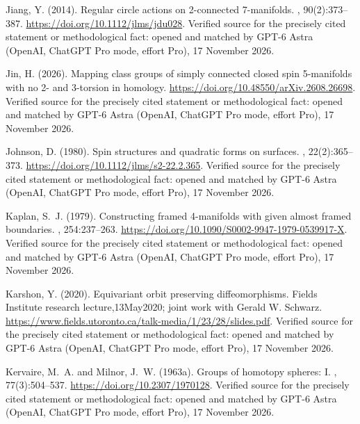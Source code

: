 \begin{thebibliography}{}
Jiang, Y. (2014).
\newblock Regular circle actions on 2-connected 7-manifolds.
, 90(2):373--387.
\newblock \url{https://doi.org/10.1112/jlms/jdu028}. Verified source for the precisely cited statement or methodological fact: opened and matched by GPT-6 Astra (OpenAI, ChatGPT Pro mode, effort Pro), 17 November 2026.

Jin, H. (2026).
\newblock Mapping class groups of simply connected closed spin 5-manifolds with
  no 2- and 3-torsion in homology.
\newblock \url{https://doi.org/10.48550/arXiv.2608.26698}. Verified source for the precisely cited statement or methodological fact: opened and matched by GPT-6 Astra (OpenAI, ChatGPT Pro mode, effort Pro), 17 November 2026.

Johnson, D. (1980).
\newblock Spin structures and quadratic forms on surfaces.
, 22(2):365--373.
\newblock \url{https://doi.org/10.1112/jlms/s2-22.2.365}. Verified source for the precisely cited statement or methodological fact: opened and matched by GPT-6 Astra (OpenAI, ChatGPT Pro mode, effort Pro), 17 November 2026.

Kaplan, S.~J. (1979).
\newblock Constructing framed 4-manifolds with given almost framed boundaries.
,
  254:237--263.
\newblock \url{https://doi.org/10.1090/S0002-9947-1979-0539917-X}. Verified source for the precisely cited statement or methodological fact: opened and matched by GPT-6 Astra (OpenAI, ChatGPT Pro mode, effort Pro), 17 November 2026.

Karshon, Y. (2020).
\newblock Equivariant orbit preserving diffeomorphisms.
\newblock Fields Institute research lecture,13May2020; joint work with Gerald
  W. Schwarz.
\newblock \url{https://www.fields.utoronto.ca/talk-media/1/23/28/slides.pdf}. Verified source for the precisely cited statement or methodological fact: opened and matched by GPT-6 Astra (OpenAI, ChatGPT Pro mode, effort Pro), 17 November 2026.

Kervaire, M.~A. and Milnor, J.~W. (1963a).
\newblock Groups of homotopy spheres: I.
, 77(3):504--537.
\newblock \url{https://doi.org/10.2307/1970128}. Verified source for the precisely cited statement or methodological fact: opened and matched by GPT-6 Astra (OpenAI, ChatGPT Pro mode, effort Pro), 17 November 2026.


\end{thebibliography}
